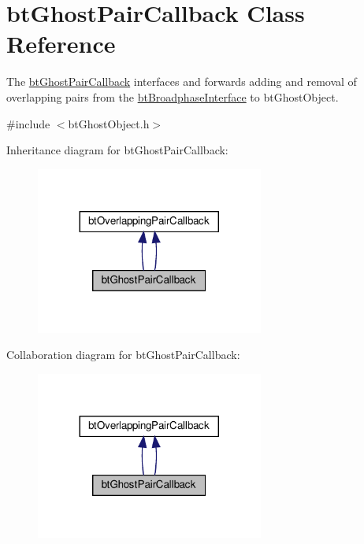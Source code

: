 \hypertarget{classbtGhostPairCallback}{}\section{bt\+Ghost\+Pair\+Callback Class Reference}
\label{classbtGhostPairCallback}


The \hyperlink{classbtGhostPairCallback}{bt\+Ghost\+Pair\+Callback} interfaces and forwards adding and removal of overlapping pairs from the \hyperlink{classbtBroadphaseInterface}{bt\+Broadphase\+Interface} to bt\+Ghost\+Object.  




{\ttfamily \#include $<$bt\+Ghost\+Object.\+h$>$}



Inheritance diagram for bt\+Ghost\+Pair\+Callback\+:
\nopagebreak
\begin{figure}[H]
\begin{center}
\leavevmode
\includegraphics[width=212pt]{classbtGhostPairCallback__inherit__graph}
\end{center}
\end{figure}


Collaboration diagram for bt\+Ghost\+Pair\+Callback\+:
\nopagebreak
\begin{figure}[H]
\begin{center}
\leavevmode
\includegraphics[width=212pt]{classbtGhostPairCallback__coll__graph}
\end{center}
\end{figure}

